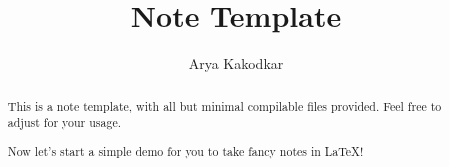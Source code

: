 \documentclass[a4paper]{report}
\author{Arya Kakodkar}
\title{Note Template}
\begin{document}
\maketitle

\begin{abstract}
	This is a note template, with all but minimal compilable files provided. Feel free to adjust for your usage.

	Now let's start a simple demo for you to take fancy notes in \LaTeX!
\end{abstract}

\newpage

\tableofcontents





\end{document}
